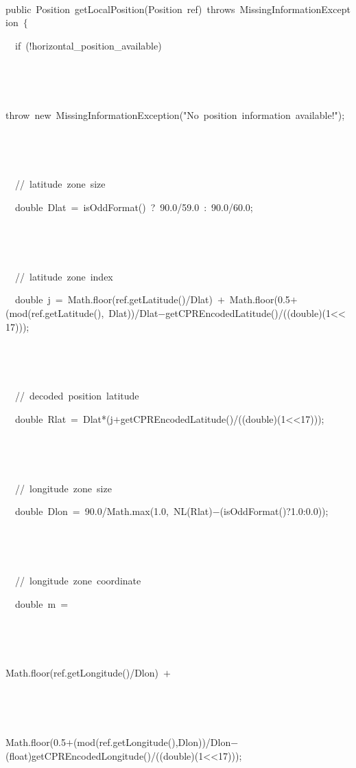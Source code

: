 {
\tt
{public\ Position\ getLocalPosition(Position\ ref)\ throws\ MissingInformationException\ $\{$\leavevmode\par
{\ }\ if\ (!horizontal\_{}position\_{}available)\leavevmode\par
{\ }}{\hlstd\ \ }{\hlstd throw\ new\ MissingInformationException("No\ position\ information\ available!");\leavevmode\par
{\ }}{\hlstd\ \ }{\hlstd \leavevmode\par
{\ }\ //\ latitude\ zone\ size\leavevmode\par
{\ }\ double\ Dlat\ $\mathord{=}$\ isOddFormat()\ ?\ 90.0/59.0\ :\ 90.0/60.0;\leavevmode\par
{\ }}{\hlstd\ \ }{\hlstd \leavevmode\par
{\ }\ //\ latitude\ zone\ index\leavevmode\par
{\ }\ double\ j\ $\mathord{=}$\ Math.floor(ref.getLatitude()/Dlat)\ $\mathord{+}$\ Math.floor(0.5$\mathord{+}$(mod(ref.getLatitude(),\ Dlat))/Dlat$\mathord{-}$getCPREncodedLatitude()/((double)(1$\mathord{<}$$\mathord{<}$17)));\leavevmode\par
{\ }}{\hlstd\ \ }{\hlstd \leavevmode\par
{\ }\ //\ decoded\ position\ latitude\leavevmode\par
{\ }\ double\ Rlat\ $\mathord{=}$\ Dlat*(j$\mathord{+}$getCPREncodedLatitude()/((double)(1$\mathord{<}$$\mathord{<}$17)));\leavevmode\par
{\ }}{\hlstd\ \ }{\hlstd \leavevmode\par
{\ }\ //\ longitude\ zone\ size\leavevmode\par
{\ }\ double\ Dlon\ $\mathord{=}$\ 90.0/Math.max(1.0,\ NL(Rlat)$\mathord{-}$(isOddFormat()?1.0:0.0));\leavevmode\par
{\ }}{\hlstd\ \ }{\hlstd \leavevmode\par
{\ }\ //\ longitude\ zone\ coordinate\leavevmode\par
{\ }\ double\ m\ $\mathord{=}$\leavevmode\par
{\ }}{\hlstd\ \ \ }{\hlstd Math.floor(ref.getLongitude()/Dlon)\ $\mathord{+}$\leavevmode\par
{\ }}{\hlstd\ \ \ }{\hlstd Math.floor(0.5$\mathord{+}$(mod(ref.getLongitude(),Dlon))/Dlon$\mathord{-}$(float)getCPREncodedLongitude()/((double)(1$\mathord{<}$$\mathord{<}$17)));\leavevmode\par
$$}}
